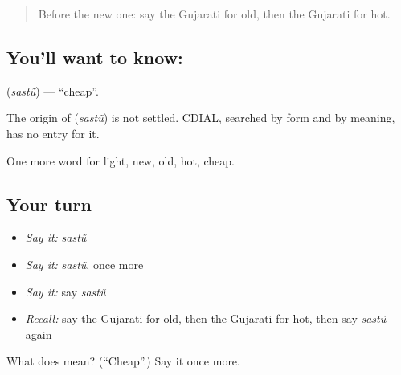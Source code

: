 \label{lesson:GU-C73-cheap}



\begin{quote}
Before the new one: say the Gujarati for old, then the Gujarati for hot.
\end{quote}

\subsection*{You'll want to know: }
\textbf{} (\emph{sastũ}) — \textquotedblleft{}cheap\textquotedblright{}.

\begin{cousinweb}
The origin of \textbf{} (\emph{sastũ}) is not settled. CDIAL, searched by form and by meaning, has no entry for it.
\end{cousinweb}

\begin{grammarlens}[title={What you've built}]
One more word for light, new, old, hot, cheap.
\end{grammarlens}

\subsection*{Your turn}
\begin{itemize}
\raggedright
  \item \emph{Say it:} \emph{sastũ}
  \item \emph{Say it:} \emph{sastũ}, once more
  \item \emph{Say it:} say \emph{sastũ}
  \item \emph{Recall:} say the Gujarati for old, then the Gujarati for hot, then say \emph{sastũ} again
\end{itemize}

\begin{tcolorbox}[breakable,colback=teal!4,colframe=teal!35!black,title={Before you move on}]
What does  mean? (\textquotedblleft{}Cheap\textquotedblright{}.) Say it once more.
\end{tcolorbox}
